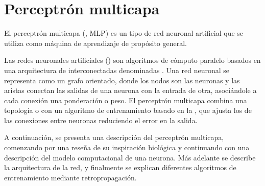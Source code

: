 %
%
%
\section{Perceptrón multicapa}
%
El perceptrón multicapa (, MLP)
\cite{mlp2,mlp1} es un tipo de red neuronal artificial que se utiliza
como máquina de aprendizaje de propósito general.

Las redes neuronales artificiales () son algoritmos de
cómputo paralelo basados en una arquitectura de 
interconectadas denominadas .
Una red neuronal se representa como un grafo orientado, donde los
nodos son las neuronas y las aristas conectan las salidas de una
neurona con la entrada de otra, asociándole a cada conexión una
ponderación o peso.
El perceptrón multicapa combina una topología  o  con un algoritmo de entrenamiento basado
en la , que ajusta los  de las conexiones
entre neuronas reduciendo el error en la salida.

A continuación, se presenta una descripción del perceptrón multicapa,
comenzando por una reseña de su inspiración biológica y continuando
con una descripción del modelo computacional de una neurona.
Más adelante se describe la arquitectura de la red, y finalmente se
explican diferentes algoritmos de entrenamiento mediante
retropropagación.
